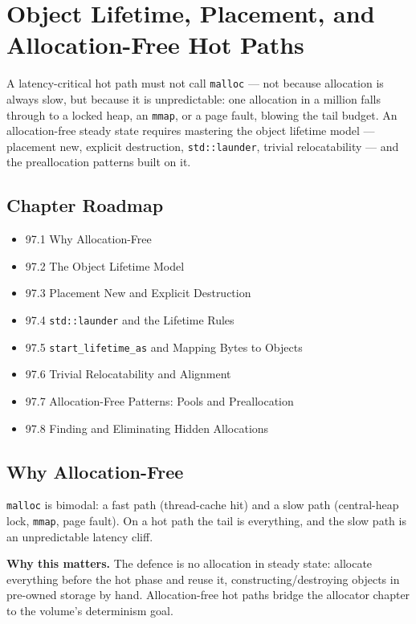 \chapter{Object Lifetime, Placement, and Allocation-Free Hot Paths}

A latency-critical hot path must not call \texttt{malloc} --- not because allocation is always slow, but because it is unpredictable: one allocation in a million falls through to a locked heap, an \texttt{mmap}, or a page fault, blowing the tail budget. An allocation-free steady state requires mastering the object lifetime model --- placement new, explicit destruction, \texttt{std::launder}, trivial relocatability --- and the preallocation patterns built on it.

\section*{Chapter Roadmap}
\begin{itemize}
\item 97.1 Why Allocation-Free
\item 97.2 The Object Lifetime Model
\item 97.3 Placement New and Explicit Destruction
\item 97.4 \texttt{std::launder} and the Lifetime Rules
\item 97.5 \texttt{start\_lifetime\_as} and Mapping Bytes to Objects
\item 97.6 Trivial Relocatability and Alignment
\item 97.7 Allocation-Free Patterns: Pools and Preallocation
\item 97.8 Finding and Eliminating Hidden Allocations
\end{itemize}

\section{Why Allocation-Free}
\texttt{malloc} is bimodal: a fast path (thread-cache hit) and a slow path (central-heap lock, \texttt{mmap}, page fault). On a hot path the tail is everything, and the slow path is an unpredictable latency cliff.

\textbf{Why this matters.} The defence is no allocation in steady state: allocate everything before the hot phase and reuse it, constructing/destroying objects in pre-owned storage by hand. Allocation-free hot paths bridge the allocator chapter to the volume's determinism goal.

